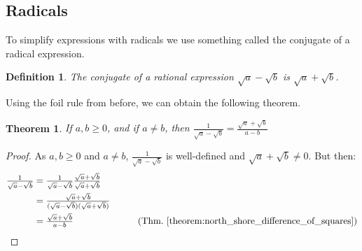 \documentclass[oneside]{book}
\theoremstyle{mystyle}
\newtheorem{theorem}{Theorem}[section]
\newtheorem{definition}{Definition}[section]
\begin{document}
\subsection{Radicals}
To simplify expressions with radicals we use something called the conjugate of a radical expression. 
\begin{definition}
The conjugate of a rational expression $\sqrt{a}-\sqrt{b}$ is $\sqrt{a}+\sqrt{b}$.
\end{definition}
Using the \gls{foil} rule from before, we can obtain the following theorem.
\begin{theorem}
If $a,b\geq 0$, and if $a\ne b$, then $\frac{1}{\sqrt{a}-\sqrt{b}} = \frac{\sqrt{a}+\sqrt{b}}{a-b}$
\end{theorem}
\begin{proof}
As $a,b\geq 0$ and $a\ne b$, $\frac{1}{\sqrt{a}-\sqrt{b}}$ is well-defined and $\sqrt{a}+\sqrt{b}\ne 0$. But then:
\begin{align*}
    \tfrac{1}{\sqrt{a}-\sqrt{b}} &= \tfrac{1}{\sqrt{a}-\sqrt{b}}\tfrac{\sqrt{a}+\sqrt{b}}{\sqrt{a}+\sqrt{b}}\\
    &= \tfrac{\sqrt{a}+\sqrt{b}}{(\sqrt{a}-\sqrt{b})(\sqrt{a}+\sqrt{b})}\\
    &= \tfrac{\sqrt{a}+\sqrt{b}}{a-b} & \tag{Thm.~\ref{theorem:north_shore_difference_of_squares}}
\end{align*}
\end{proof}
\end{document}
